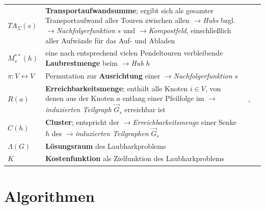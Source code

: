 \begin{tabular}{lp{11cm}cm{1cm}}
$TA_{\Sigma}(s)$
& \textbf{Transportaufwandsumme}; ergibt sich als gesamter Transportaufwand aller Touren zwischen allen $\rightarrow$\textit{Hubs} bzgl. $\rightarrow$\textit{Nachfolgerfunktion} $s$ und $\rightarrow$\textit{Kompostfeld}, einschließlich aller Aufwände für das Auf- und Abladen
&\pageref{Transportaufwandsformel_5}\\

$M^{**}_s(h)$
&eine nach entsprechend vielen Pendeltouren verbleibende \textbf{Laubrestmenge} beim $\rightarrow$\textit{Hub} $h$
&\pageref{Laubrestmenge}\\

$\pi:V \leftrightarrow V$
& Permutation zur \textbf{Ausrichtung} einer $\rightarrow$\textit{Nachfolgerfunktion} $s$
& \pageref{Ausrichtung}\\

$R(a)$
&\textbf{Erreichbarkeitsmenge}; enthält alle Knoten $i \in V$, von denen aus der Knoten $a$ entlang einer Pfeilfolge im $\rightarrow$\textit{induzierten Teilgraph} $\vec{G}_s$ erreichbar ist
& \pageref{Erreichbarkeitsmenge},\pageref{Erreichbarkeitsmenge_2}\\

$C(h)$
& \textbf{Cluster}; entspricht der $\rightarrow$\textit{Erreichbarkeitsmenge} einer Senke $h$ des  $\rightarrow$\textit{induzierten Teilgraphen} $\vec{G}_s$
&\pageref{Cluster}\\

$\Lambda(G)$
& \textbf{Lösungsraum} des Laubharkproblems 
&\pageref{Lambda}\\

$K$
& \textbf{Kostenfunktion} als Zielfunktion des Laubharkproblems
&\pageref{Kostenfunktion}\\

\end{tabular}

































\chapter{Algorithmen}\label{Anhang_Algorithmen}


